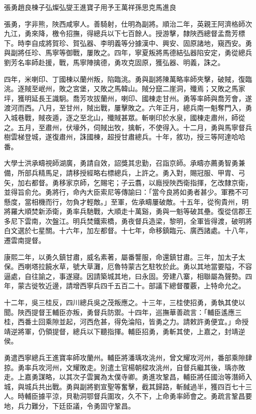 
\begin{pinyinscope}
張勇趙良棟子弘燦弘燮王進寶子用予王萬祥孫思克馬進良

張勇，字非熊，陜西咸寧人。善騎射，仕明為副將。順治二年，英親王阿濟格師次九江，勇來降，檄令招撫，得總兵以下七百餘人。授游擊，隸陜西總督孟喬芳標下。時李自成將賀珍、賀弘器、李明義等分據漢中、興安、固原諸地，窺西安。勇與副將任珍、馬寧等御戰，屢敗之。四年，寧夏叛將馬德結弘器陷安定，勇從總兵劉芳名率師赴援，戰，馬寧陣擒德，勇攻克固原，獲弘器、明義，誅之。

四年，米喇印、丁國棟以蘭州叛，陷臨洮。勇與副將陳萬略率師夾擊，破賊，復臨洮。逐賊至岷州，敗之宮堡，又敗之馬韓山。賊分竄二崖洞，殲焉；又敗之馬家坪，獲明延長王識駉。喬芳攻拔蘭州，喇印、國棟走甘州。勇等率師與喬芳會，遂渡河而西。八月，至甘州，賊出戰，屢擊敗之。六年正月，總兵南一魁奪門入，勇入城巷戰，賊夜遁，逐之至北山，殲賊甚眾。斬喇印於水泉，國棟走肅州，師從之。五月，至肅州，伏壕外，伺賊出牧，擒斬，不使得入。十二月，勇與馬寧督兵樹雲梯登城，遂復肅州，誅國棟，超授甘肅總兵。十年，敘功，授三等阿達哈哈番。

大學士洪承疇視師湖廣，勇請自效，詔獎其忠勤，召詣京師。承疇亦薦勇智勇兼備，所部兵精馬足，請移授經略右標總兵，上許之。勇入對，賜冠服、甲胄、弓矢，加右都督。勇移家京師，乞賜宅；子云翥，以廕授陜西衛指揮，乞改隸京衛，並得旨俞允。勇將行，命內大臣索尼等傳諭曰：「當今良將如勇者甚少。軍務不可懸度，當相機而行，勿負才輕敵。」至軍，佐承疇屢破敵。十五年，從徇貴州，明將羅大順焚新添衛，勇率兵馳戰，大順走十萬谿，勇與一魁等破其壘。復從信郡王多尼下雲南，次盤江。明兵焚鐵索橋，勇夜督兵造梁，黎明，全軍皆得渡，破明將白文選於七星關。十六年，加左都督。十七年，命移鎮臨元、廣西諸處。十八年，遷雲南提督。

康熙二年，以勇久鎮甘肅，威名素著，屬番讋服，命還鎮甘肅。三年，加太子太保。西喇塔拉饒水草，號大草灘，厄魯特蒙古乞駐牧於此。勇以其地當要隘，不容逼處，自往諭之，事遂寢。因請築城其地，曰永固。旁建八寨，相聯屬為聲勢。四年，蒙古徙牧近邊，請增西寧兵四千五百二十。部議下總督覆覈，上特命允之。

十二年，吳三桂反，四川總兵吳之茂叛應之。十三年，三桂使招勇，勇執其使以聞。陜西提督王輔臣亦叛，勇督兵防禦。十四年，巡撫華善疏言：「輔臣遙應三桂，西番土回乘隙並起，河西危甚，得免淪陷，皆勇之力。請敕許勇便宜。」命授靖逆將軍，仍領提督，總兵以下聽指揮。輔臣招勇，勇斬其使，上嘉之，封靖逆侯。

勇遣西寧總兵王進寶率師攻蘭州。輔臣將潘瑀攻洮州，曾文耀攻河州，番部乘隙肆掠。勇率兵攻河州，文耀敗走。別遣土官楊朝樑攻洮州，自督兵繼其後，瑀亦敗走。上嘉勇謀略，以其次子雲翼為太僕寺卿。勇進攻鞏昌，輔臣將任國治等潛師入城，與城兵共出戰。勇與副將劉宣聖等奮擊，截其歸路，斬馘過半，獲四百七十三人。時輔臣據平涼，貝勒洞鄂督兵圍攻，久不下，上命勇率師會之。勇疏言鞏昌要地，兵力難分，下廷臣議，令勇固守鞏昌。


\end{pinyinscope}
